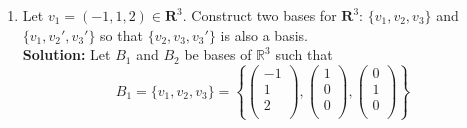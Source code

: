 \documentclass[12pt]{article}
\newcommand{\R}{\mathbb{R}}
\begin{document}
\begin{enumerate}
\begin{mybox}
\begin{proof}
        Then we let $U \equiv \{(u_1, u_2, u_3, u_4) \mid u_3 = u_4\}$. Thus, $v_1 \in U$ and $v_2 \in U$ holds since $0 = 0$. But $v_3 \not \in U$ since $1 \neq 0$ and similarly $v_4 \not \in U$ since $0 \neq 1$. $v_1$ and $v_2$ do not span $U$ since, for example, no such $av_1 + bv_2 = (1,1,1,1) \in U$, which violates the definition of a basis being a \textit{list of vectors in V that is linearly independent and \underline{spans} V}. Thus $v_1, v_2$ is \textbf{not} a basis for $U$.
    \end{proof}
\end{mybox}
\newpage
\item Let $v_1 = (-1,1,2) \in \mathbf{R}^3$.  Construct two bases for $\mathbf{R}^3$:  $\{v_1, v_2,v_3\}$ and $\{v_1, v_2', v_3'\}$ so that $\{v_2, v_3, v_3'\}$ is also a basis.\vspace{0.5in}\\
    \textbf{Solution:} Let $B_1$ and $B_2$ be bases of $\R^3$ such that
    $$B_1 = \{v_1, v_2, v_3\} = 
    \left\{\begin{pmatrix}
        -1 \\ 1 \\ 2 \\ 
    \end{pmatrix}, 
    \begin{pmatrix}
        1 \\ 0 \\ 0 \\ 
    \end{pmatrix}, 
    \begin{pmatrix}
        0 \\ 1 \\ 0 \\ 
    \end{pmatrix} 
    \right\}$$
    

\end{enumerate}
\end{document}
